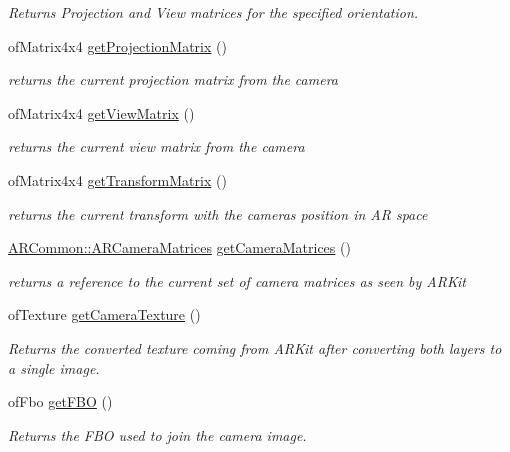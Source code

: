 \begin{DoxyCompactItemize}
\begin{DoxyCompactList}\small\item\em Returns Projection and View matrices for the specified orientation. \end{DoxyCompactList}\item 
of\+Matrix4x4 \hyperlink{class_a_r_core_1_1_a_r_cam_a19409c89b0bcbaad62e5d405d194f8a7}{get\+Projection\+Matrix} ()
\begin{DoxyCompactList}\small\item\em returns the current projection matrix from the camera \end{DoxyCompactList}\item 
of\+Matrix4x4 \hyperlink{class_a_r_core_1_1_a_r_cam_a7ca28300844875464c7821620665d3b5}{get\+View\+Matrix} ()
\begin{DoxyCompactList}\small\item\em returns the current view matrix from the camera \end{DoxyCompactList}\item 
of\+Matrix4x4 \hyperlink{class_a_r_core_1_1_a_r_cam_a280c37d6b4aa16169637cf3f5332c9d3}{get\+Transform\+Matrix} ()
\begin{DoxyCompactList}\small\item\em returns the current transform with the camera\textquotesingle{}s position in AR space \end{DoxyCompactList}\item 
\hyperlink{struct_a_r_common_1_1_a_r_camera_matrices}{A\+R\+Common\+::\+A\+R\+Camera\+Matrices} \hyperlink{class_a_r_core_1_1_a_r_cam_a1398ffe9720425cfbc99635b08bc80d6}{get\+Camera\+Matrices} ()
\begin{DoxyCompactList}\small\item\em returns a reference to the current set of camera matrices as seen by A\+R\+Kit \end{DoxyCompactList}\item 
of\+Texture \hyperlink{class_a_r_core_1_1_a_r_cam_ae816096383bfc8fbcf6b67ab82b3d629}{get\+Camera\+Texture} ()
\begin{DoxyCompactList}\small\item\em Returns the converted texture coming from A\+R\+Kit after converting both layers to a single image. \end{DoxyCompactList}\item 
of\+Fbo \hyperlink{class_a_r_core_1_1_a_r_cam_a4c8f3c9b55f5852dc7a8554fe6ac0888}{get\+F\+BO} ()
\begin{DoxyCompactList}\small\item\em Returns the F\+BO used to join the camera image. \end{DoxyCompactList}\end{DoxyCompactItemize}
